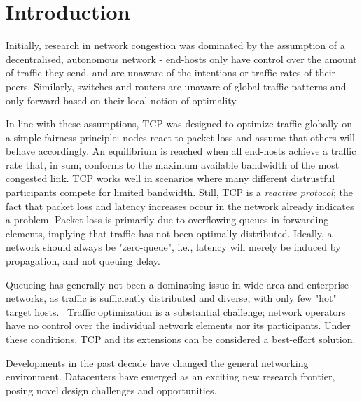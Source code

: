 \documentclass[sigconf]{acmart}
\begin{document}


\maketitle

%
%
%
%
%
%
%
\section{Introduction}
\label{sec:intro}

Initially, research in network congestion was dominated by the assumption of a decentralised, autonomous network - end-hosts only have control over the amount of traffic they send, and are unaware of the intentions or traffic rates of their peers. Similarly, switches and routers are unaware of global traffic patterns and only forward based on their local notion of optimality.

In line with these assumptions, TCP was designed to optimize traffic globally on a simple fairness principle: nodes react to packet loss and assume that others will behave accordingly. An equilibrium is reached when all end-hosts achieve a traffic rate that, in sum, conforms to the maximum available bandwidth of the most congested link.
TCP works well  in scenarios where many different distrustful participants compete for limited bandwidth. Still, TCP is a \textit{reactive protocol}; the fact that packet loss and latency increases occur in the network already indicates a problem. Packet loss is primarily due to overflowing queues in forwarding elements, implying that traffic has not been optimally distributed. Ideally, a network should always be "zero-queue", i.e., latency will merely be induced by propagation, and not queuing delay. 

Queueing has generally not been a dominating issue in wide-area and enterprise networks, as traffic is sufficiently distributed and diverse, with only few "hot" target hosts.~\cite{hedera, microte} Traffic optimization is a substantial challenge; network operators have no control over the individual network elements nor its participants. Under these conditions, TCP and its extensions can be considered a best-effort solution.

Developments in the past decade have changed the general networking environment. Datacenters have emerged as an exciting new research frontier, posing novel design challenges and opportunities.
\end{document}
